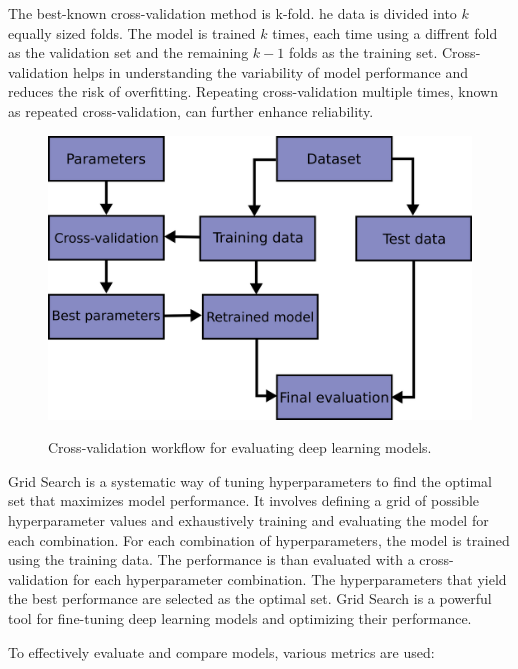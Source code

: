 The best-known cross-validation method is k-fold. he data is divided into $k$ equally sized folds. The model is trained $k$ times, each time using a diffrent fold as the validation set and the remaining $k-1$ folds as the training set. Cross-validation helps in understanding the variability of model performance and reduces the risk of overfitting. Repeating cross-validation multiple times, known as repeated cross-validation, can further enhance reliability. \autocite{krstajicCrossvalidationPitfallsWhen2014}

\begin{figure}[hbt]
    \centering
    \begin{minipage}[t]{.8\textwidth}
    \caption{Cross-validation workflow for evaluating deep learning models.}
    \includegraphics[width=.8\textwidth]{img/cross_validation_workflow.png}\\
    \label{fig:cross-validation-workflow}
    \end{minipage}
\end{figure}

Grid Search is a systematic way of tuning hyperparameters to find the optimal set that maximizes model performance. It involves defining a grid of possible hyperparameter values and exhaustively training and evaluating the model for each combination. For each combination of hyperparameters, the model is trained using the training data. The performance is than evaluated with a cross-validation for each hyperparameter combination. The hyperparameters that yield the best performance are selected as the optimal set. Grid Search is a powerful tool for fine-tuning deep learning models and optimizing their performance. \autocite{bergstraRandomSearchHyperParameter}

To effectively evaluate and compare models, various metrics are used: \autocite{PrecisionRecall2024} \autocite{Fscore2024} \autocite{AccuracyPrecision2024} 

